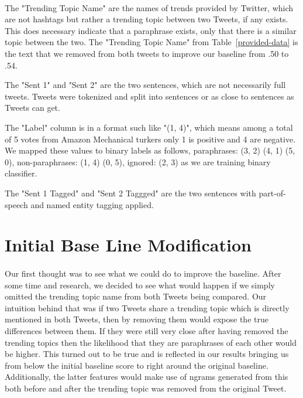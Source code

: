 \documentclass[11pt,letterpaper]{article}
\begin{document}
\paragraph{}
The "Trending Topic Name" are the names of trends provided by Twitter, which are not hashtags but rather a trending topic between two Tweets, if any exists. This does necessary indicate that a paraphrase exists, only that there is a similar topic between the two. The "Trending Topic Name" from Table~\ref{provided-data} is the text that we removed from both tweets to improve our baseline from .50 to .54.

The "Sent 1" and "Sent 2" are the two sentences, which are not necessarily full tweets. Tweets were tokenized and split into sentences or as close to sentences as Tweets can get.

The "Label" column is in a format such like "(1, 4)", which means among a total of 5 votes 
from Amazon Mechanical turkers only 1 is positive and 4 are negative. We mapped these values to binary labels as follows,
paraphrases: (3, 2) (4, 1) (5, 0), non-paraphrases: (1, 4) (0, 5), ignored: (2, 3) as we are training binary classifier.

The "Sent 1 Tagged" and "Sent 2 Taggged" are the two sentences with part-of-speech and named entity tagging applied. 

\section{Initial Base Line Modification}
\paragraph{}
Our first thought was to see what we could do to improve the baseline. After some time and research, we decided to see what would happen if we simply omitted the trending topic name from both Tweets being compared. Our intuition behind that was if two Tweets share a trending topic which is directly mentioned in both Tweets, then by removing them would expose the true differences between them. If they were still very close after having removed the trending topics then the likelihood that they are paraphrases of each other would be higher. This turned out to be true and is reflected in our results bringing us from below the initial baseline score to right around the original baseline. Additionally, the latter features would make use of ngrams generated from this both before and after the trending topic was removed from the original Tweet.
\end{document}
